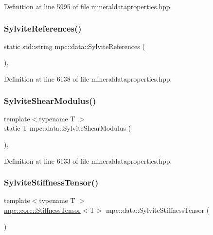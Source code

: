 Definition at line 5995 of file mineraldataproperties.\+hpp.

\mbox{\label{namespacempc_1_1data_aaf2dfd109b81445818b54d8c314b8e1a}} 
\subsubsection{\texorpdfstring{Sylvite\+References()}{SylviteReferences()}}
{\footnotesize\ttfamily static std\+::string mpc\+::data\+::\+Sylvite\+References (\begin{DoxyParamCaption}{ }\end{DoxyParamCaption})\hspace{0.3cm}{\ttfamily [inline]}, {\ttfamily [static]}}



Definition at line 6138 of file mineraldataproperties.\+hpp.

\mbox{\label{namespacempc_1_1data_af3dbfa9d5e35d687ec9db62d3b04e79a}} 
\subsubsection{\texorpdfstring{Sylvite\+Shear\+Modulus()}{SylviteShearModulus()}}
{\footnotesize\ttfamily template$<$typename T $>$ \\
static T mpc\+::data\+::\+Sylvite\+Shear\+Modulus (\begin{DoxyParamCaption}{ }\end{DoxyParamCaption})\hspace{0.3cm}{\ttfamily [inline]}, {\ttfamily [static]}}



Definition at line 6133 of file mineraldataproperties.\+hpp.

\mbox{\label{namespacempc_1_1data_ac5a6918a5ed0de859d31ce5bb64d9595}} 
\subsubsection{\texorpdfstring{Sylvite\+Stiffness\+Tensor()}{SylviteStiffnessTensor()}}
{\footnotesize\ttfamily template$<$typename T $>$ \\
\mbox{\hyperlink{structmpc_1_1core_1_1_stiffness_tensor}{mpc\+::core\+::\+Stiffness\+Tensor}}$<$T$>$ mpc\+::data\+::\+Sylvite\+Stiffness\+Tensor (\begin{DoxyParamCaption}{ }\end{DoxyParamCaption})}



